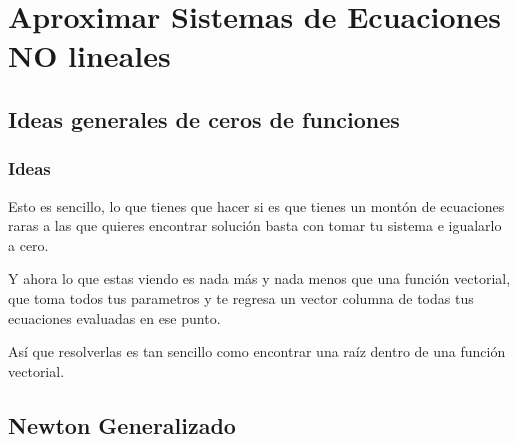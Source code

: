\documentclass[12pt, fleqn]{report}                             %
\theoremstyle{break}                                            %
\begin{document}
\part{Aproximar Sistemas de Ecuaciones NO lineales}
\clearpage

    \chapter{Ideas generales de ceros de funciones}

        \section{Ideas}

            Esto es sencillo, lo que tienes que hacer si es que tienes un montón de
            ecuaciones raras a las que quieres encontrar solución basta con tomar
            tu sistema e igualarlo a cero.

            Y ahora lo que estas viendo es nada más y nada menos que una función
            vectorial, que toma todos tus parametros y te regresa un vector columna
            de todas tus ecuaciones evaluadas en ese punto.

            Así que resolverlas es tan sencillo como encontrar una raíz dentro de 
            una función vectorial.
            

    \chapter{Newton Generalizado}
\end{document}
